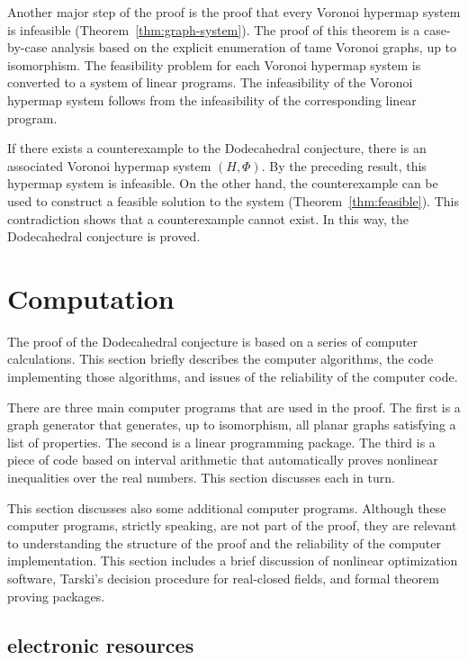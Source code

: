 Another major step of the proof is the proof that every Voronoi hypermap
system is infeasible (Theorem~\ref{thm:graph-system}).   The proof of this theorem
is a case-by-case analysis based on the explicit enumeration of
tame Voronoi graphs, up to isomorphism.   The feasibility problem for 
each Voronoi hypermap system is converted to a system of linear programs.
The infeasibility of the Voronoi hypermap system follows from the
infeasibility of the corresponding linear program.

If there exists a counterexample to the Dodecahedral conjecture,
there is an associated Voronoi hypermap system $(H,\Phi)$.  By the preceding
result, this hypermap system is infeasible.  On the other hand, 
the counterexample can be used to construct a feasible solution to the system 
(Theorem~\ref{thm:feasible}).
This contradiction shows that a counterexample cannot exist.
In this way, the Dodecahedral conjecture is proved.







\section{Computation}

The proof of the Dodecahedral conjecture is based on a series
of computer calculations.  This section briefly describes the
computer algorithms, the code implementing those algorithms,
and issues of the reliability of the computer code.

There are three main computer programs that are used in the proof.
The first is a graph generator that generates, up to isomorphism,
 all planar graphs satisfying a list of properties.  The second is
a linear programming package.  The third is a piece of code based
on interval arithmetic that
automatically proves nonlinear inequalities over the real numbers.
This section discusses each in turn.  

This section discusses  also some
additional computer programs.  Although these computer programs,
strictly speaking, are not part of the proof, they are relevant
to understanding the structure of the proof and the reliability of
the computer implementation.   This section includes a brief discussion of
nonlinear optimization software, Tarski's decision procedure for
real-closed fields, and formal theorem proving packages.

\subsection{electronic resources}

